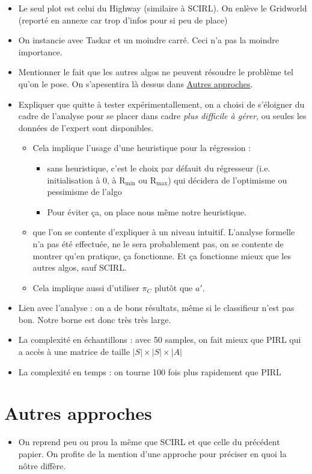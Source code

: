 \documentclass[11pt]{article}
\begin{document}
\begin{itemize}
\item Le seul plot est celui du Highway (similaire à SCIRL). On enlève le Gridworld (reporté en annexe car trop d'infos pour si peu de place)
\item On instancie avec Taskar et un moindre carré. Ceci n'a pas la moindre importance.
\item Mentionner le fait que les autres algos ne peuvent résoudre le problème tel qu'on le pose. On s'apesentira là dessus dans \hyperref[sec-7]{Autres approches}.
\item Expliquer que quitte à tester expérimentallement, on a choisi de s'éloigner du cadre de l'analyse pour se placer dans cadre \emph{plus difficile à gérer}, ou seules les données de l'expert sont disponibles.
\begin{itemize}
\item Cela implique l'usage d'une heuristique pour la régression :
\begin{itemize}
\item sans heuristique, c'est le choix par défauit du régresseur (i.e. initialisation à 0, à R$_{\mathrm{min}}$ ou R$_{\mathrm{max}}$) qui décidera de l'optimisme ou pessimisme de l'algo
\item Pour éviter ça, on place nous même notre heuristique.
\end{itemize}
\item que l'on se contente d'expliquer à un niveau intuitif. L'analyse formelle n'a pas été effectuée, ne le sera probablement pas, on se contente de montrer qu'en pratique, ça fonctionne. Et ça fonctionne mieux que les autres algos, sauf SCIRL.
\item Cela implique aussi d'utiliser $\pi_C$ plutôt que $a'$.
\end{itemize}
\item Lien avec l'analyse : on a de bons résultats, même si le classifieur n'est pas bon. Notre borne est donc très très large.
\item La complexité en échantillons : avec 50 samples, on fait mieux que PIRL qui a accès à une matrice de taille $|S|\times|S|\times |A|$
\item La complexité en temps : on tourne 100 fois plus rapidement que PIRL
\end{itemize}
\section{Autres approches}
\label{sec-7}

\begin{itemize}
\item On reprend peu ou prou la même que SCIRL et que celle du précédent papier. On profite de la mention d'une approche pour préciser en quoi la nôtre diffère.
\end{itemize}
\end{document}
